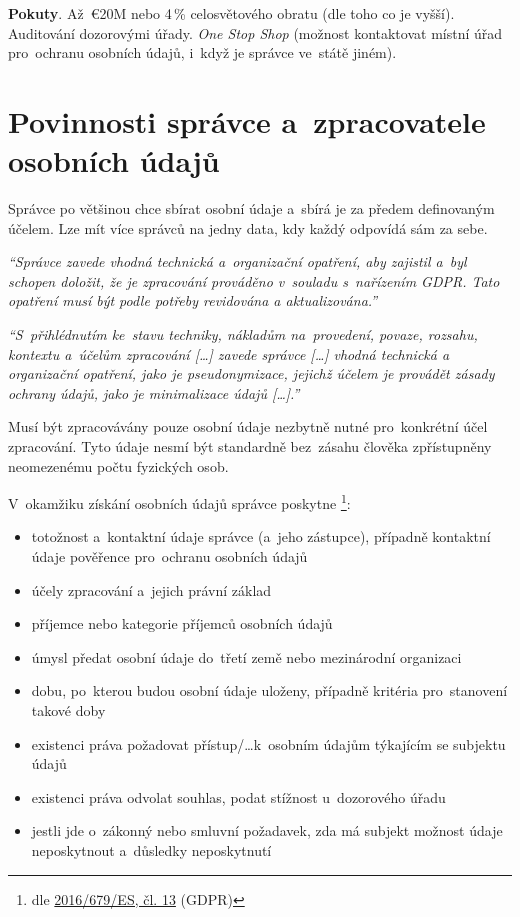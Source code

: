 \textbf{Pokuty}. Až~€20M nebo 4\,\% celosvětového obratu (dle toho co je vyšší). Auditování dozorovými úřady. \emph{One Stop Shop} (možnost kontaktovat místní úřad pro~ochranu osobních údajů, i~když je správce ve~státě jiném).

\clearpage
\section{Povinnosti správce a~zpracovatele osobních údajů}
\label{question-7}
Správce po většinou chce sbírat osobní údaje a~sbírá je za předem definovaným účelem. Lze mít více správců na jedny data, kdy každý odpovídá sám za sebe.

\emph{\enquote{Správce zavede vhodná technická a~organizační opatření, aby zajistil a~byl schopen doložit, že je zpracování prováděno v~souladu s~nařízením GDPR. Tato opatření musí být podle potřeby revidována a aktualizována.}}

\emph{\enquote{S~přihlédnutím ke~stavu techniky, nákladům na~provedení, povaze, rozsahu, kontextu a~účelům zpracování [\dots] zavede správce [\dots] vhodná technická a organizační opatření, jako je pseudonymizace, jejichž účelem je provádět zásady ochrany údajů, jako je minimalizace údajů [\dots].}}

Musí být zpracovávány pouze osobní údaje nezbytně nutné pro~konkrétní účel zpracování. Tyto údaje nesmí být standardně bez~zásahu člověka zpřístupněny neomezenému počtu fyzických osob.

\vspace*{1em}

V~okamžiku získání osobních údajů správce poskytne%
\footnote{%
	dle \href{https://eur-lex.europa.eu/legal-content/CS/TXT/HTML/?uri=CELEX:32016R0679\#d1e2243-1-1}{2016/679/ES, čl. 13}  (GDPR)%
}:

\begin{itemize}[noitemsep]
\item totožnost a~kontaktní údaje správce (a~jeho zástupce), případně kontaktní údaje pověřence pro~ochranu osobních údajů
\item účely zpracování a~jejich právní základ
\item příjemce nebo kategorie příjemců osobních údajů
\item úmysl předat osobní údaje do~třetí země nebo mezinárodní organizaci
\item dobu, po~kterou budou osobní údaje uloženy, případně kritéria pro~stanovení takové doby
\item existenci práva požadovat přístup/\dots k~osobním údajům týkajícím se subjektu údajů
\item existenci práva odvolat souhlas, podat stížnost u~dozorového úřadu
\item jestli jde o~zákonný nebo smluvní požadavek, zda má subjekt možnost údaje neposkytnout a~důsledky neposkytnutí
\end{itemize}

